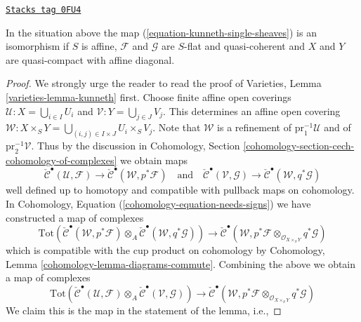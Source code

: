 \begin{lemma}
\label{perfect-lemma-kunneth-single-sheaf}
\href{https://stacks.math.columbia.edu/tag/0FU4}{\texttt{Stacks tag 0FU4}}

In the situation above the map (\ref{equation-kunneth-single-sheaves}) is an
isomorphism if $S$ is affine, $\mathcal{F}$ and $\mathcal{G}$ are $S$-flat and
quasi-coherent and $X$ and $Y$ are quasi-compact with affine diagonal.
\end{lemma}

\begin{proof}

We strongly urge the reader to read the proof of
Varieties, Lemma \ref{varieties-lemma-kunneth} first.
Choose finite affine open coverings
$\mathcal{U} : X = \bigcup_{i \in I} U_i$ and
$\mathcal{V} : Y = \bigcup_{j \in J} V_j$.
This determines an affine open covering
$\mathcal{W} : X \times_S Y = \bigcup_{(i, j) \in I \times J} U_i \times_S V_j$.
Note that $\mathcal{W}$ is a refinement of
$\text{pr}_1^{-1}\mathcal{U}$ and of $\text{pr}_2^{-1}\mathcal{V}$.
Thus by the discussion in Cohomology, Section
\ref{cohomology-section-cech-cohomology-of-complexes}
we obtain maps
$$
\check{\mathcal{C}}^\bullet(\mathcal{U}, \mathcal{F})
\to
\check{\mathcal{C}}^\bullet(\mathcal{W}, p^*\mathcal{F})
\quad\text{and}\quad
\check{\mathcal{C}}^\bullet(\mathcal{V}, \mathcal{G})
\to
\check{\mathcal{C}}^\bullet(\mathcal{W}, q^*\mathcal{G})
$$
well defined up to homotopy and compatible with pullback maps on cohomology.
In Cohomology, Equation (\ref{cohomology-equation-needs-signs})
we have constructed a map of complexes
$$
\text{Tot}(
\check{\mathcal{C}}^\bullet(\mathcal{W}, p^*\mathcal{F})
\otimes_A
\check{\mathcal{C}}^\bullet(\mathcal{W}, q^*\mathcal{G}))
\longrightarrow
\check{\mathcal{C}}^\bullet(\mathcal{W},
p^*\mathcal{F} \otimes_{\mathcal{O}_{X \times_S Y}}
q^*\mathcal{G})
$$
which is compatible with the cup product on cohomology by
Cohomology, Lemma \ref{cohomology-lemma-diagrams-commute}.
Combining the above we obtain a map of complexes
\begin{equation}
\label{equation-kunneth-on-cech}
\text{Tot}(
\check{\mathcal{C}}^\bullet(\mathcal{U}, \mathcal{F})
\otimes_A
\check{\mathcal{C}}^\bullet(\mathcal{V}, \mathcal{G}))
\to
\check{\mathcal{C}}^\bullet(\mathcal{W},
p^*\mathcal{F}
\otimes_{\mathcal{O}_{X \times_S Y}}
q^*\mathcal{G})
\end{equation}
We claim this is the map in the statement of the lemma, i.e.,

\end{proof}
